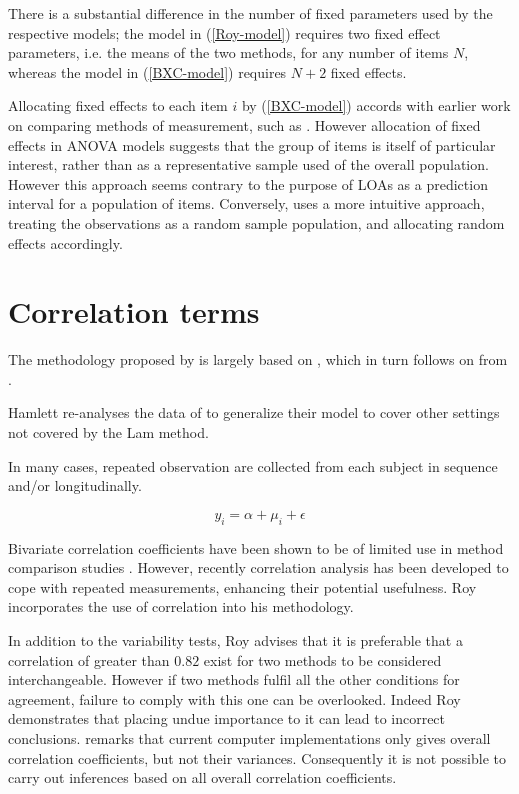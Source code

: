 \documentclass[12pt, a4paper]{report}
\theoremstyle{plain}
\theoremstyle{definition}
\theoremstyle{remark}
\begin{document}
There is a substantial difference in the number of fixed parameters used by the respective models; the model in (\ref{Roy-model}) requires two fixed effect parameters, i.e. the means of the two methods, for any number of items $N$, whereas the model in (\ref{BXC-model}) requires $N+2$ fixed effects.

Allocating fixed effects to each item $i$ by (\ref{BXC-model}) accords with earlier work on comparing methods of measurement, such as \citet{Grubbs48}. However allocation of fixed effects in ANOVA models suggests that the group of items is itself of particular interest, rather than as a representative sample used of the overall population. However this approach seems contrary to the purpose of LOAs as a prediction interval for a population of items. Conversely, \citet{roy}
uses a more intuitive approach, treating the observations as a random sample population, and allocating random effects accordingly.






\section{Correlation terms}
The methodology proposed by \citet{ARoy2009} is largely based on \citet{hamlett}, which in turn follows on from \citet{lam}.



Hamlett re-analyses the data of \citet{lam} to generalize their model to cover other settings not covered by the Lam method.

In many cases, repeated observation are collected from each subject in sequence  and/or longitudinally.


\[ y_i = \alpha + \mu_i + \epsilon \]


Bivariate correlation coefficients have been shown to be of
limited use in method comparison studies \citep{BA86}. However,
recently correlation analysis has been developed to cope with
repeated measurements, enhancing their potential usefulness. Roy
incorporates the use of correlation into his methodology.


In addition to the variability tests, Roy advises that it is preferable that a correlation of greater than $0.82$ exist for two methods to be considered interchangeable. However if two methods fulfil all the other conditions for agreement, failure to comply with this one can be overlooked. Indeed Roy demonstrates that placing undue importance to it can lead to incorrect conclusions. \citet{ARoy2009} remarks that current computer implementations only gives overall correlation coefficients, but not their variances. Consequently it is not possible to carry out inferences based on all overall correlation coefficients.
\end{document}
